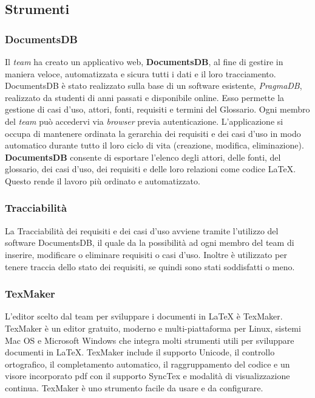 \subsection{Strumenti}

\subsubsection{DocumentsDB}
Il \textit{team} ha creato un applicativo web, \textbf{DocumentsDB}, al fine di gestire in maniera veloce, automatizzata 
e sicura tutti i dati e il loro tracciamento. DocumentsDB è stato realizzato sulla base di un software esistente, 
\textit{PragmaDB}, realizzato da
studenti di anni passati e disponibile online. Esso permette la gestione di casi d’uso, attori, fonti, requisiti e termini del Glossario. 
Ogni membro del \textit{team} può accedervi via \textit{browser} previa autenticazione.
L’applicazione si occupa di mantenere ordinata la gerarchia dei requisiti e dei casi d'uso in modo automatico durante tutto il loro ciclo di vita (creazione, modifica, eliminazione).
\textbf{DocumentsDB} consente di esportare l’elenco degli attori, delle fonti, del glossario, dei casi d’uso, dei requisiti e delle loro relazioni come codice \LaTeX{}.
Questo rende il lavoro più ordinato e automatizzato.

\subsubsection{Tracciabilità}
La Tracciabilità dei requisiti e dei casi d'uso avviene tramite l'utilizzo del software DocumentsDB, 
il quale da la possibilità ad ogni membro del team di inserire, modificare o eliminare requisiti o casi d'uso. 
Inoltre è utilizzato per tenere traccia dello stato dei requisiti, se quindi sono stati soddisfatti o meno.

\subsubsection{TexMaker}
L'editor scelto dal team per sviluppare i documenti in \LaTeX{} è TexMaker.  
TexMaker è un editor gratuito, moderno e multi-piattaforma per Linux, sistemi Mac OS e Microsoft Windows che integra molti strumenti utili per sviluppare documenti in \LaTeX{}.
TexMaker include il supporto Unicode, il controllo ortografico, il completamento automatico, il raggruppamento del codice e un visore incorporato pdf con il supporto SyncTex e modalità di visualizzazione continua.
TexMaker è uno strumento facile da usare e da configurare.


